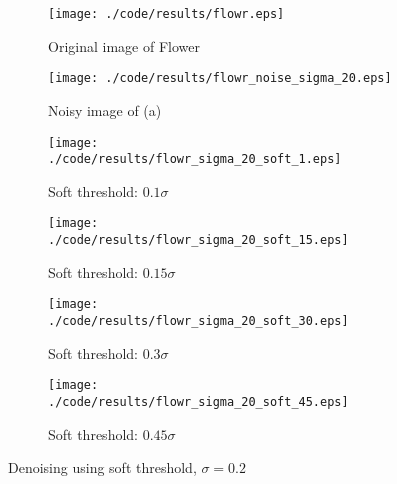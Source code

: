 \documentclass[journal,comsoc]{IEEEtran}
\begin{document}
\begin{figure}[!hbt]
  \centering
  \begin{subfigure}{.25\textwidth}
    \centering
    \texttt{[image: ./code/results/flowr.eps]}
    \caption{Original image of Flower}
    \label{subfig:original-image-of-flower}
  \end{subfigure}%
  \begin{subfigure}{.25\textwidth}
    \centering
    \texttt{[image: ./code/results/flowr\_noise\_sigma\_20.eps]}
    \caption{Noisy image of (a)}
    \label{subfig:flower-sigma-10-noisy-image-of-a}
  \end{subfigure}

  \begin{subfigure}{0.25\textwidth}
    \centering{}
    \texttt{[image: ./code/results/flowr\_sigma\_20\_soft\_1.eps]}
    \caption{Soft threshold: $0.1\sigma$}
  \end{subfigure}%
  \begin{subfigure}{.25\textwidth}
    \centering{}
    \texttt{[image: ./code/results/flowr\_sigma\_20\_soft\_15.eps]}
    \caption{Soft threshold: $0.15\sigma$}
  \end{subfigure}

  \begin{subfigure}{0.25\textwidth}
    \centering{}
    \texttt{[image: ./code/results/flowr\_sigma\_20\_soft\_30.eps]}
    \caption{Soft threshold: $0.3\sigma$}
  \end{subfigure}%
  \begin{subfigure}{.25\textwidth}
    \centering{}
    \texttt{[image: ./code/results/flowr\_sigma\_20\_soft\_45.eps]}
    \caption{Soft threshold: $0.45\sigma$}
  \end{subfigure}
  
  \caption{Denoising using soft threshold, $\sigma=0.2$}
  \label{fig:flower-sigma-20-soft-threshold}
\end{figure}
\end{document}
